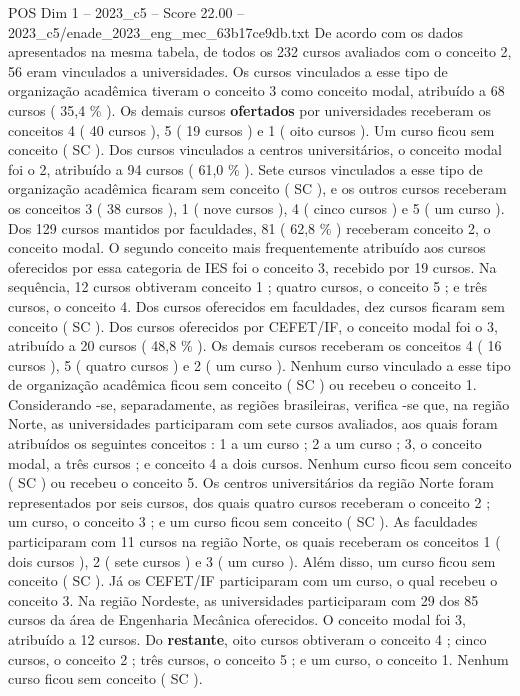 \begin{textsample}{POS Dim 1 – 2023\_c5 – Score 22.00 – 2023\_c5/enade\_2023\_eng\_mec\_63b17ce9db.txt}
De acordo com os dados apresentados na mesma tabela, de todos os 232 cursos avaliados com o conceito 2, 56 eram vinculados a universidades.
Os cursos vinculados a esse tipo de organização acadêmica tiveram o conceito 3 como conceito modal, atribuído a 68 cursos ( 35,4 \% ).
Os demais cursos \textbf{ofertados} por universidades receberam os conceitos 4 ( 40 cursos ), 5 ( 19 cursos ) e 1 ( oito cursos ).
Um curso ficou sem conceito ( SC ).
Dos cursos vinculados a centros universitários, o conceito modal foi o 2, atribuído a 94 cursos ( 61,0 \% ).
Sete cursos vinculados a esse tipo de organização acadêmica ficaram sem conceito ( SC ), e os outros cursos receberam os conceitos 3 ( 38 cursos ), 1 ( nove cursos ), 4 ( cinco cursos ) e 5 ( um curso ).
Dos 129 cursos mantidos por faculdades, 81 ( 62,8 \% ) receberam conceito 2, o conceito modal.
O segundo conceito mais frequentemente atribuído aos cursos oferecidos por essa categoria de IES foi o conceito 3, recebido por 19 cursos.
Na sequência, 12 cursos obtiveram conceito 1 ; quatro cursos, o conceito 5 ; e três cursos, o conceito 4.
Dos cursos oferecidos em faculdades, dez cursos ficaram sem conceito ( SC ).
Dos cursos oferecidos por CEFET/IF, o conceito modal foi o 3, atribuído a 20 cursos ( 48,8 \% ).
Os demais cursos receberam os conceitos 4 ( 16 cursos ), 5 ( quatro cursos ) e 2 ( um curso ).
Nenhum curso vinculado a esse tipo de organização acadêmica ficou sem conceito ( SC ) ou recebeu o conceito 1.
Considerando -se, separadamente, as regiões brasileiras, verifica -se que, na região Norte, as universidades participaram com sete cursos avaliados, aos quais foram atribuídos os seguintes conceitos : 1 a um curso ; 2 a um curso ; 3, o conceito modal, a três cursos ; e conceito 4 a dois cursos.
Nenhum curso ficou sem conceito ( SC ) ou recebeu o conceito 5.
Os centros universitários da região Norte foram representados por seis cursos, dos quais quatro cursos receberam o conceito 2 ; um curso, o conceito 3 ; e um curso ficou sem conceito ( SC ).
As faculdades participaram com 11 cursos na região Norte, os quais receberam os conceitos 1 ( dois cursos ), 2 ( sete cursos ) e 3 ( um curso ).
Além disso, um curso ficou sem conceito ( SC ).
Já os CEFET/IF participaram com um curso, o qual recebeu o conceito 3.
Na região Nordeste, as universidades participaram com 29 dos 85 cursos da área de Engenharia Mecânica oferecidos.
O conceito modal foi 3, atribuído a 12 cursos.
Do \textbf{restante}, oito cursos obtiveram o conceito 4 ; cinco cursos, o conceito 2 ; três cursos, o conceito 5 ; e um curso, o conceito 1.
Nenhum curso ficou sem conceito ( SC ).

\end{textsample}
